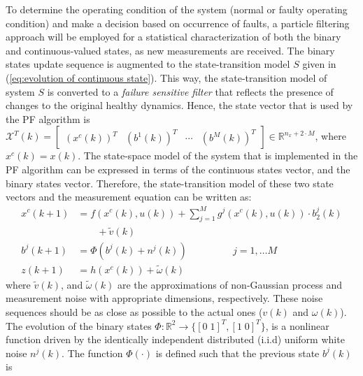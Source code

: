 \documentclass[10pt,twocolumn,twoside]{IEEEtran}
\begin{document}
To determine the operating condition of the system (normal or faulty
operating condition) and make a decision based on occurrence of faults,
a particle filtering approach will be employed for a statistical characterization
of both the binary and continuous-valued states, as new measurements
are received. The binary states update sequence is augmented to the
state-transition model $S$ given in (\ref{eq:evolution of continuous state}).
This way, the state-transition model of system $S$ is converted to
a \emph{failure sensitive filter} that reflects the presence of changes
to the original healthy dynamics. Hence, the state vector that is
used by the PF algorithm is $\mathcal{X}^T(k) = [\begin{array}{cccc}
 (x^{c}(k)) ^{T} & (b^{1} (k)) ^{T} & \cdots & (b ^{M}(k)) ^{T} \end{array}] \in \mathbb{R} ^{n_{x}+2 \cdot M}$, where $x^{c} (k) = x(k)$. The state-space model of the system that is implemented in the PF algorithm can be
expressed in terms of the continuous states vector, and the binary
states vector. Therefore, the state-transition model of these two
state vectors and the measurement equation can be written as:
\begin{equation}
\begin{aligned}x^{c}\left(k+1\right) & =f\left(x^{c}\left(k\right),u\left(k\right)\right)+\sum_{j=1}^{M}g^{j}\left(x^{c}\left(k\right),u\left(k\right)\right)\cdot b_{2}^{j}\left(k\right)\\
 & \qquad+\tilde{v}\left(k\right)\\
b^{j}\left(k+1\right) & =\Phi\left(b^{j}\left(k\right)+n^{j}\left(k\right)\right)\text{ }\qquad\qquad j=1,\ldots M\\
z\left(k+1\right) & =h\left(x^{c}\left(k\right)\right)+\tilde{\omega}\left(k\right)
\end{aligned}
\label{eq:evolution of continuous state}
\end{equation}
\noindent where $\tilde{v}\left(k\right)$, and $\tilde{\omega}\left(k\right)$
are the approximations of non-Gaussian process and measurement noise
with appropriate dimensions, respectively. These noise sequences should
be as close as possible to the actual ones ($v\left(k\right)$ and
$\omega\left(k\right)$). The evolution of the binary states $\Phi:\mathbb{R}^{2}\rightarrow\{[0\;1]^{T},[1\;0]^{T}\}$,
is a nonlinear function driven by the identically independent distributed
(i.i.d) uniform white noise $n^{j}\left(k\right)$. The function $\Phi\left(\cdot\right)$
is defined such that the previous state $b^{j}\left(k\right)$ is
\end{document}
